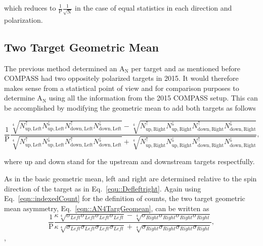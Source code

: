 \noindent
which reduces to $\frac{1}{\mathrm{P}}\frac{1}{\sqrt{\mathrm{N}}}$ in the case
of equal statistics in each direction and polarization.

\subsection{Two Target Geometric Mean} \label{sec::TwoTargGeoMean}
The previous method determined an A$_{\mathrm{N}}$ per target and as mentioned
before COMPASS had two oppositely polarized targets in 2015.  It would therefore
makes sense from a statistical point of view and for comparison purposes to
determine A$_{\mathrm{N}}$ using all the information from the 2015 COMPASS
setup.  This can be accomplished by modifying the geometric mean to add both
targets as follows

\begin{equation}
  \label{eqn::AN4TargGeomean}
  \frac{1}{\mathrm{P}}
  \frac{
    \sqrt[4]{
      N_{\mathrm{up,Left}}^{\uparrow}N_{\mathrm{up, Left}}^{\downarrow}
      N_{\mathrm{down,Left}}^{\uparrow}N_{\mathrm{down, Left}}^{\downarrow}
    } -
    \sqrt[4]{
      N_{\mathrm{up,Right}}^{\uparrow}N_{\mathrm{up, Right}}^{\downarrow}
      N_{\mathrm{down,Right}}^{\uparrow}N_{\mathrm{down, Right}}^{\downarrow}
    }
  }{
    \sqrt[4]{
      N_{\mathrm{up,Left}}^{\uparrow}N_{\mathrm{up, Left}}^{\downarrow}
      N_{\mathrm{down,Left}}^{\uparrow}N_{\mathrm{down, Left}}^{\downarrow}
    } +
    \sqrt[4]{
      N_{\mathrm{up,Right}}^{\uparrow}N_{\mathrm{up, Right}}^{\downarrow}
      N_{\mathrm{down,Right}}^{\uparrow}N_{\mathrm{down, Right}}^{\downarrow}
    }
  },
\end{equation}

\noindent
where up and down stand for the upstream and downstream targets respectfully.

As in the basic geometric mean, left and right are determined relative to
the spin direction of the target as in Eq.~\ref{equ::Defleftright}.  Again using
Eq.~\ref{eqn::indexedCount} for the definition of counts, the two target
geometric mean asymmetry, Eq.~\ref{eqn::AN4TargGeomean}, can be written as
\begin{equation}
  \frac{1}{\mathrm{P}}
  \frac{
    \kappa \sqrt[4]{\sigma_{Left}\sigma_{Left}\sigma_{Left}\sigma_{Left}} -
    \sqrt[4]{\sigma_{Right}\sigma_{Right}\sigma_{Right}\sigma_{Right}}
  }{
    \kappa \sqrt[4]{\sigma_{Left}\sigma_{Left}\sigma_{Left}\sigma_{Left}} +
    \sqrt[4]{\sigma_{Right}\sigma_{Right}\sigma_{Right}\sigma_{Right}}
  },
\end{equation},

